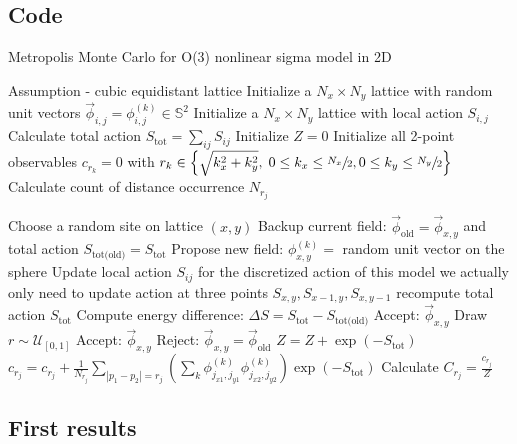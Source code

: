 \documentclass[10pt,a4paper]{article}
\theoremstyle{definition}
\begin{document}
\subsection{Code}
\begin{algorithm}[!h]
\caption{Metropolis Monte Carlo for O(3) nonlinear sigma model in 2D}
\begin{algorithmic}[1]
\STATE Assumption - cubic equidistant lattice
\STATE Initialize a $N_x \times N_y$ lattice with random unit vectors $\vec{\phi}_{i,j}=\phi^{(k)}_{i,j} \in \mathbb{S}^2$
\STATE Initialize a $N_x \times N_y$ lattice with local action $S_{i,j}$
\STATE Calculate total action $S_\text{tot}=\sum_{ij}S_{ij}$
\STATE Initialize $Z=0$ 
\STATE Initialize all 2-point observables $c_{r_k}=0$ with $r_k\in\left\{\sqrt{k_x^2+k_y^2},\; 0\le k_x\le\sfrac{N_x}{2}, 0\le k_y\le\sfrac{N_y}{2}\right\}$
\STATE Calculate count of distance occurrence $N_{r_j}$

        \STATE Choose a random site on lattice $(x,y)$
        \STATE Backup current field: $\vec{\phi}_{\text{old}} = \vec{\phi}_{x,y}$ and total action $S_\text{tot(old)}=S_\text{tot}$
        \STATE Propose new field: $\phi^{(k)}_{x,y} =$ random unit vector on the sphere
        \STATE Update local action $S_{ij}$ for the discretized action of this model we actually only need to update action at three points $S_{x,y},S_{x-1,y},S_{x,y-1}$
        \STATE recompute total action $S_\text{tot}$
        \STATE Compute energy difference: $\Delta S = S_\text{tot} - S_\text{tot(old)}$
            \STATE Accept: $\vec{\phi}_{x,y}$
        \ELSE
            \STATE Draw $r \sim \mathcal{U}_{[0,1]}$
                \STATE Accept: $\vec{\phi}_{x,y}$
            \ELSE
                \STATE Reject: $\vec{\phi}_{x,y}=\vec{\phi}_\text{old}$
            \ENDIF
        \ENDIF
    	\STATE $Z=Z+\exp(-S_\text{tot})$
    		\STATE $c_{r_j}=c_{r_j}+\frac{1}{N_{r_j}}\sum_{|p_1-p_2|=r_j}\left(\sum_k\phi^{(k)}_{j_{x1},j_{y1}}\phi^{(k)}_{j_{x2},j_{y2}}\right)\exp(-S_\text{tot})$
    	\ENDFOR
    \ENDIF
\ENDFOR
\STATE Calculate $C_{r_j}=\frac{c_{r_j}}{Z}$
\end{algorithmic}
\end{algorithm}

\subsection{First results}
\end{document}
